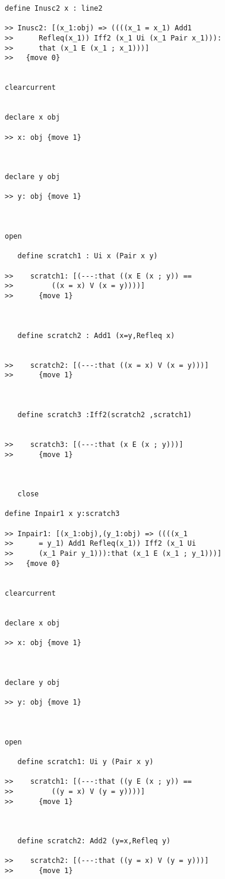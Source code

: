 \documentclass[12pt]{article}
\begin{document}
\begin{verbatim}
define Inusc2 x : line2

>> Inusc2: [(x_1:obj) => ((((x_1 = x_1) Add1
>>      Refleq(x_1)) Iff2 (x_1 Ui (x_1 Pair x_1))):
>>      that (x_1 E (x_1 ; x_1)))]
>>   {move 0}


clearcurrent


declare x obj

>> x: obj {move 1}



declare y obj

>> y: obj {move 1}



open

   define scratch1 : Ui x (Pair x y)

>>    scratch1: [(---:that ((x E (x ; y)) ==
>>         ((x = x) V (x = y))))]
>>      {move 1}



   define scratch2 : Add1 (x=y,Refleq x)


>>    scratch2: [(---:that ((x = x) V (x = y)))]
>>      {move 1}



   define scratch3 :Iff2(scratch2 ,scratch1)


>>    scratch3: [(---:that (x E (x ; y)))]
>>      {move 1}



   close

define Inpair1 x y:scratch3

>> Inpair1: [(x_1:obj),(y_1:obj) => ((((x_1
>>      = y_1) Add1 Refleq(x_1)) Iff2 (x_1 Ui
>>      (x_1 Pair y_1))):that (x_1 E (x_1 ; y_1)))]
>>   {move 0}


clearcurrent


declare x obj

>> x: obj {move 1}



declare y obj

>> y: obj {move 1}



open

   define scratch1: Ui y (Pair x y)

>>    scratch1: [(---:that ((y E (x ; y)) ==
>>         ((y = x) V (y = y))))]
>>      {move 1}



   define scratch2: Add2 (y=x,Refleq y)

>>    scratch2: [(---:that ((y = x) V (y = y)))]
>>      {move 1}




\end{verbatim}
\end{document}
